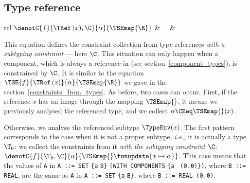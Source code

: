 \subsection{Type reference}\label{collection_from_type_references}

\noindent
\begin{tabular}{rcl}
     $\denotC{f}{\TRef \, (x), \C}{\alpha}{\TSEmap{\R}}$
   & \hspace*{-4mm} = & \\
\end{tabular}

\medskip

This equation defines the constraint collection from type references
\emph{with a subtyping constraint} --- here $\C$. This situation can
only happen when a component, which is always a reference in \core
(see section~\ref{component_types}), is constrained by $\C$. It is
similar to the equation $\TSE{f}{\TRef \, (x)}{\alpha}{\TSEmap{\R}}$
we gave in the section~\ref{constraints_from_types}. As before, two
cases can occur. First, if the reference $x$ has an image through the
mapping $\TSEmap{}$, it means we previously analysed the referenced
type, and we collect $\alpha \CEeq \TSEmap{}(x)$.

Otherwise, we analyse the referenced subtype $\TypeEnv (x)$. The first
pattern corresponds to the case when it is not a proper subtype,
\emph{i.e.,} it is actually a type $\T_0$: we collect the constraints from it
\emph{with the subtyping constraint $\C$}:
$\denotC{f}{\T_0,\C}{\alpha}{\TSEmap{} \funupdate \{x \mapsto
\alpha\}}$. This case means that the values of \texttt{\small A} in
\texttt{\small A ::= SET} \verb+{+\texttt{a} \texttt{\small B}\verb+}+
\texttt{\small (WITH COM\-PO\-NENTS} \verb+{+\texttt{a} \texttt{\small
(0.0)}\verb+}+\texttt{\small )}, where \texttt{\small B ::= REAL}, are
the same as \texttt{\small A} in \texttt{\small A ::= SET}
\verb+{+\texttt{a} \texttt{\small B}\verb+}+, where \texttt{\small B
::= REAL (0.0)}.

